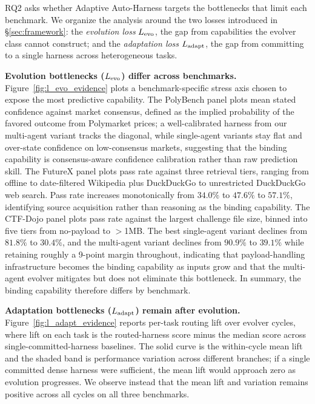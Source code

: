 RQ2 asks whether Adaptive Auto-Harness targets the bottlenecks that limit each benchmark. We organize the analysis around the two losses introduced in \S\ref{sec:framework}: the \emph{evolution loss} $L_{\text{evo}}$, the gap from capabilities the evolver class cannot construct; and the \emph{adaptation loss} $L_{\text{adapt}}$, the gap from committing to a single harness across heterogeneous tasks.

\noindent\textbf{Evolution bottlenecks ($L_{\text{evo}}$) differ across benchmarks.} Figure~\ref{fig:l_evo_evidence} plots a benchmark-specific stress axis chosen to expose the most predictive capability. The PolyBench panel plots mean stated confidence against market consensus, defined as the implied probability of the favored outcome from Polymarket prices; a well-calibrated harness from our multi-agent variant tracks the diagonal, while single-agent variants stay flat and over-state confidence on low-consensus markets, suggesting that the binding capability is consensus-aware confidence calibration rather than raw prediction skill. The FutureX panel plots pass rate against three retrieval tiers, ranging from offline to date-filtered Wikipedia plus DuckDuckGo to unrestricted DuckDuckGo web search. Pass rate increases monotonically from $34.0\%$ to $47.6\%$ to $57.1\%$, identifying source acquisition rather than reasoning as the binding capability. The CTF-Dojo panel plots pass rate against the largest challenge file size, binned into five tiers from no-payload to $>$1MB. The best single-agent variant declines from $81.8\%$ to $30.4\%$, and the multi-agent variant declines from $90.9\%$ to $39.1\%$ while retaining roughly a 9-point margin throughout, indicating that payload-handling infrastructure becomes the binding capability as inputs grow and that the multi-agent evolver mitigates but does not eliminate this bottleneck. In summary, the binding capability therefore differs by benchmark.

\noindent\textbf{Adaptation bottlenecks ($L_{\text{adapt}}$) remain after evolution.} Figure~\ref{fig:l_adapt_evidence} reports per-task routing lift over evolver cycles, where lift on each task is the routed-harness score minus the median score across single-committed-harness baselines. The solid curve is the within-cycle mean lift and the shaded band is performance variation across different branches; if a single committed dense harness were sufficient, the mean lift would approach zero as evolution progresses. We observe instead that the mean lift and variation remains positive across all cycles on all three benchmarks. 

